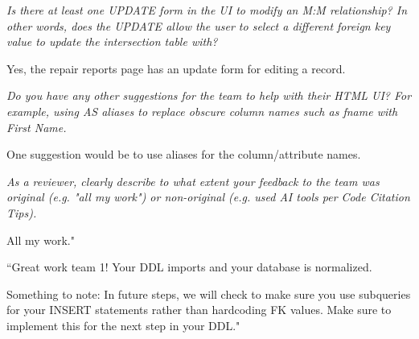 \documentclass{article}
\begin{document}
\begin{tcolorbox}[colback=secondarycolor, colframe=primarycolor, title=\textbf{Step 3: Peer Review 4 - Daniel Guardado}]
\vspace{0.2cm}
\textit{Is there at least one UPDATE form in the UI to modify an M:M relationship? In other words, does the UPDATE allow the user to select a different foreign key value to update the intersection table with?}

\vspace{0.05cm}
Yes, the repair reports page has an update form for editing a record.

\vspace{0.2cm}
\textit{Do you have any other suggestions for the team to help with their HTML UI? For example, using AS aliases to replace obscure column names such as fname with First Name.}

\vspace{0.05cm}
One suggestion would be to use aliases for the column/attribute names.

\vspace{0.2cm}
\textit{As a reviewer, clearly describe to what extent your feedback to the team was original (e.g. "all my work") or non-original (e.g. used AI tools per Code Citation Tips). }

\vspace{0.05cm}
All my work."

\end{tcolorbox}

\vspace{0.2cm}


\begin{tcolorbox}[colback=secondarycolor, colframe=primarycolor, title=\textbf{Step 2: TA Review - Madelyn Lazar}]
``Great work team 1! Your DDL imports and your database is normalized. 

\vspace{0.2cm}
Something to note: In future steps, we will check to make sure you use subqueries for your INSERT statements rather than hardcoding FK values. Make sure to implement this for the next step in your DDL."
\end{tcolorbox}

\vspace{0.5cm}
\end{document}
